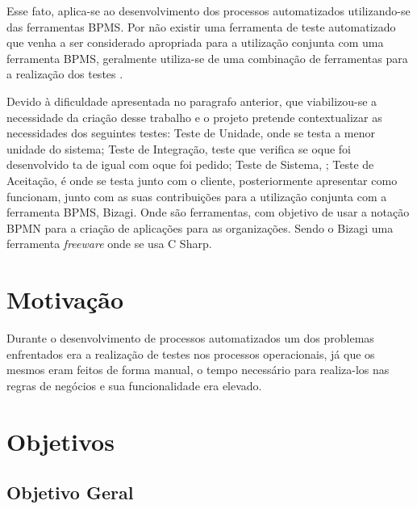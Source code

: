 Esse fato, aplica-se ao desenvolvimento dos processos automatizados utilizando-se das ferramentas BPMS. Por não existir uma ferramenta de teste automatizado que venha a ser considerado apropriada para a utilização conjunta com uma ferramenta BPMS, geralmente utiliza-se de uma combinação de ferramentas para a realização dos testes \cite{TestCaseBPMN}.  

Devido à dificuldade apresentada no paragrafo anterior, que viabilizou-se a necessidade da criação desse trabalho e o projeto pretende contextualizar as necessidades dos seguintes testes: Teste de Unidade, onde se testa a menor unidade do sistema; Teste de Integração, teste que verifica se oque foi desenvolvido ta de igual com oque foi pedido; Teste de Sistema, ; Teste de Aceitação, é onde se testa junto com o cliente, posteriormente apresentar como funcionam, junto com as suas contribuições para a utilização conjunta com a ferramenta BPMS,   Bizagi. Onde são ferramentas, com objetivo de usar a notação BPMN para a criação de aplicações para as organizações. Sendo o Bizagi uma ferramenta \textit{freeware} onde se usa C Sharp.





\section{Motivação}
\label{sec:motivacao}  
	Durante o desenvolvimento de processos automatizados um dos problemas enfrentados era a realização de testes nos processos operacionais, já que os mesmos eram feitos de forma manual, o tempo necessário para realiza-los nas regras de negócios e sua funcionalidade era elevado.
    


\section{Objetivos}
\label{sec:objetivos}
	
\subsection{Objetivo Geral}
\label{sec:objetivo-geral}
	
